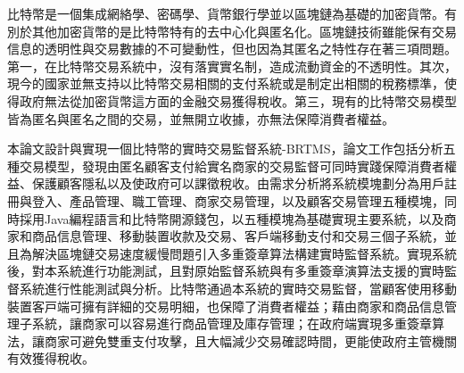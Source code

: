 
\begin{cabstract}

	⽐特幣是⼀個集成網絡學、密碼學、貨幣銀⾏學並以區塊鏈為基礎的加密貨幣。有別於其他加密貨幣的是⽐特幣特有的去中⼼化與匿名化。區塊鏈技術雖能保有交易信息的透明性與交易數據的不可變動性，但也因為其匿名之特性存在著三項問題。第一，在⽐特幣交易系統中，沒有落實實名制，造成流動資金的不透明性。其次，現今的國家並無⽀持以⽐特幣交易相關的⽀付系統或是制定出相關的稅務標準，使得政府無法從加密貨幣這⽅⾯的⾦融交易獲得稅收。第三，現有的⽐特幣交易模型皆為匿名與匿名之間的交易，並無開⽴收據，亦無法保障消費者權益。

	本論⽂設計與實現⼀個比特幣的實時交易監督系統-BRTMS，論文工作包括分析五種交易模型，發現由匿名顧客支付給實名商家的交易監督可同時實踐保障消費者權益、保護顧客隱私以及使政府可以課徵稅收。由需求分析將系統模塊劃分為用戶註冊與登入、產品管理、職工管理、商家交易管理，以及顧客交易管理五種模塊，同時採用Java編程語言和比特幣開源錢包，以五種模塊為基礎實現主要系統，以及商家和商品信息管理、移動裝置收款及交易、客戶端移動支付和交易三個子系統，並且為解決區塊鏈交易速度緩慢問題引入多重簽章算法構建實時監督系統。實現系統後，對本系統進行功能測試，且對原始監督系統與有多重簽章演算法支援的實時監督系統進行性能測試與分析。比特幣通過本系統的實時交易監督，當顧客使用移動裝置客⼾端可擁有詳細的交易明細，也保障了消費者權益；藉由商家和商品信息管理子系統，讓商家可以容易進⾏商品管理及庫存管理；在政府端實現多重簽章算法，讓商家可避免雙重⽀付攻擊，且大幅減少交易確認時間，更能使政府主管機關有效獲得稅收。

\end{cabstract}

